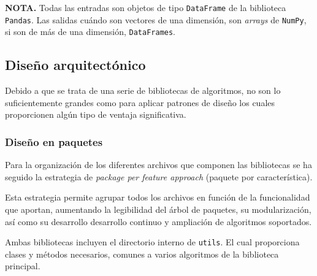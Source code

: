 \textbf{NOTA.} Todas las entradas son objetos de tipo \texttt{DataFrame} de la biblioteca \texttt{Pandas}. Las salidas cuándo son vectores de una dimensión, son \textit{arrays} de \texttt{NumPy}, si son de más de una dimensión, \texttt{DataFrames}.

\subsection{Diseño arquitectónico}
Debido a que se trata de una serie de bibliotecas de algoritmos, no son lo suficientemente grandes como para aplicar patrones de diseño los cuales proporcionen algún tipo de ventaja significativa. 

\subsubsection{Diseño en paquetes}
Para la organización de los diferentes archivos que componen las bibliotecas se ha seguido la estrategia de \textit{package per feature approach} (paquete por característica).

Esta estrategia permite agrupar todos los archivos en función de la funcionalidad que aportan, aumentando la legibilidad del árbol de paquetes, su modularización, así como su desarrollo desarrollo continuo y ampliación de algoritmos soportados.

Ambas bibliotecas incluyen el directorio interno de \texttt{utils}. El cual proporciona clases y métodos necesarios, comunes a varios algoritmos de la biblioteca principal. 
